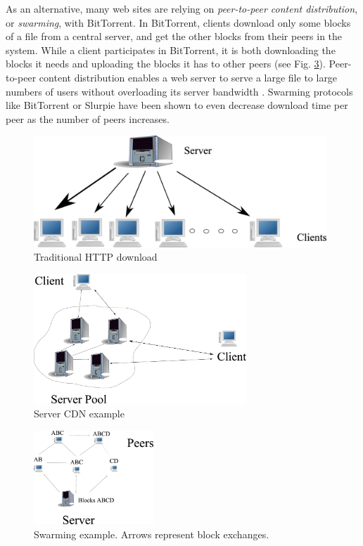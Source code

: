 As an alternative, many web sites are relying on \emph{peer-to-peer content distribution}, or \emph{swarming}, with BitTorrent.  In BitTorrent, clients download only some blocks of a file from a central server, and get the other blocks from their peers in the system.  While a client participates in BitTorrent, it is both downloading the blocks it needs and uploading the blocks it has to other peers (see Fig. \ref{fig:normal_swarm}).  Peer-to-peer content distribution enables a web server to serve a large file to large numbers of users without overloading its server bandwidth \cite{zappala}. Swarming protocols like BitTorrent \cite{cohen} or Slurpie \cite{slurpie} have been shown to even decrease download time per peer as the number of peers increases. 
\begin{figure}
\begin{center}
   \includegraphics[width=11cm]{pics/traditional_http.eps}
    \caption{Traditional HTTP download}
 \label{fig:traditional_http}
 \end{center}
\end{figure}
\begin{figure}
    \centering
  \includegraphics[width=8cm]{pics/server_side_only.eps}
  \caption{Server CDN example}
  \label{fig:server_only}
\end{figure}   
\begin{figure}
 \centering
 \includegraphics[width=4.5cm]{pics/normal_swarm.eps}
 \caption{Swarming example.  Arrows represent block exchanges.}
 \label{fig:normal_swarm}
\end{figure}

